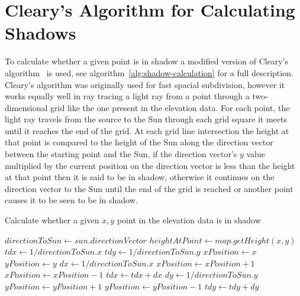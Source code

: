 \documentclass[12pt]{report}
\begin{document}
\section{Cleary's Algorithm for Calculating Shadows}
To calculate whether a given point is in shadow a modified version of Cleary's algorithm~\cite{cleary} is used, see algorithm~\ref{alg:shadow-calculation} for a full description. Cleary's algorithm was originally used for fast spacial subdivision, however it works equally well in ray tracing a light ray from a point through a two-dimensional grid like the one present in the elevation data. For each point, the light ray travels from the source to the Sun through each grid square it meets until it reaches the end of the grid. At each grid line intersection the height at that point is compared to the height of the Sun along the direction vector between the starting point and the Sun, if the direction vector's $y$ value multiplied by the current position on the direction vector is less than the height at that point then it is said to be in shadow, otherwise it continues on the direction vector to the Sun until the end of the grid is reached or another point causes it to be seen to be in shadow.

\begin{algorithm}[h]
\caption{Calculate whether a given $x,y$ point in the elevation data is in shadow}
\label{alg:shadow-calculation}%
\begin{algorithmic}           %
\STATE $\mathit{directionToSun} \leftarrow \mathit{sun}.\mathit{directionVector}$
\STATE $\mathit{heightAtPoint} \leftarrow \mathit{map}.\mathit{getHeight}(x,y)$
\STATE $\mathit{tdx} \leftarrow 1 / \mathit{directionToSun}.x$
\STATE $\mathit{tdy} \leftarrow 1 / \mathit{directionToSun}.y$
\STATE $\mathit{xPosition} \leftarrow x$
\STATE $\mathit{yPosition} \leftarrow y$
	\ENDIF
		\STATE $dx \leftarrow 1 / \mathit{directionToSun}.x$
			\STATE $\mathit{xPosition} \leftarrow \mathit{xPosition} + 1$	
		\ELSE
			\STATE $\mathit{xPosition} \leftarrow \mathit{xPosition} - 1$	
		\ENDIF
		\STATE $tdx \leftarrow tdx + dx$
	\ELSE
		\STATE $dy \leftarrow 1 / \mathit{directionToSun}.y$
			\STATE $\mathit{yPosition} \leftarrow \mathit{yPosition} + 1$	
		\ELSE
			\STATE $\mathit{yPosition} \leftarrow \mathit{yPosition} - 1$	
		\ENDIF
		\STATE $tdy \leftarrow tdy + dy$		
	\ENDIF
\ENDWHILE
{}
\end{algorithmic}
\end{algorithm}
\end{document}
